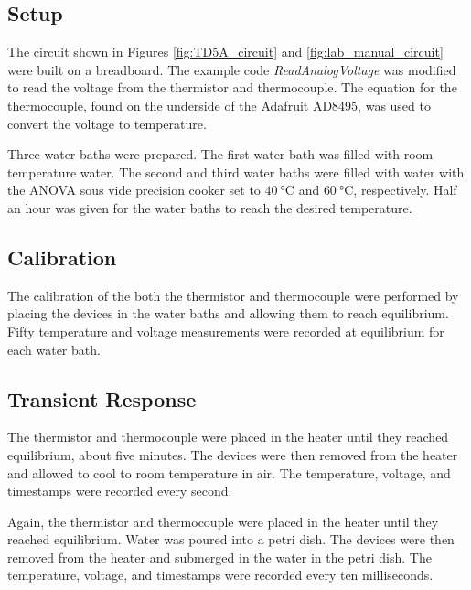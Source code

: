 \subsection{Setup}
\noindent The circuit shown in Figures \ref{fig:TD5A_circuit} and \ref{fig:lab_manual_circuit} were built on a breadboard. The example code \textit{ReadAnalogVoltage} 
was modified to read the voltage from the thermistor and thermocouple. The equation for the thermocouple, found on the underside of the Adafruit AD8495, 
was used to convert the voltage to temperature.

Three water baths were prepared. The first water bath was filled with room temperature water. The second and third water baths were filled with water 
with the ANOVA sous vide precision cooker set to $\qty{40}{\celsius}$ and $\qty{60}{\celsius}$, respectively. Half an hour was given for the water baths to reach
the desired temperature. 

\subsection{Calibration}
\noindent The calibration of the both the thermistor and thermocouple were performed by placing the devices in the water baths and allowing them to reach
equilibrium. Fifty temperature and voltage measurements were recorded at equilibrium for each water bath. 

\subsection{Transient Response}
The thermistor and thermocouple were placed in the heater until they reached equilibrium, about five minutes. The devices were then removed from the heater
and allowed to cool to room temperature in air. The temperature, voltage, and timestamps were recorded every second. 

Again, the thermistor and thermocouple were placed in the heater until they reached equilibrium. Water was poured into a petri dish.
The devices were then removed from the heater and submerged in the water in the petri dish. The temperature, voltage, and timestamps were recorded 
every ten milliseconds. 